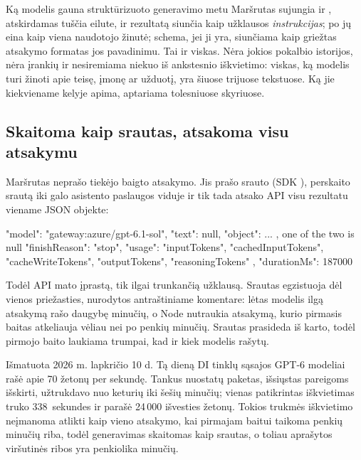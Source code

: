\begin{aibox}{Ką modelis gauna struktūrizuoto generavimo metu}
Maršrutas sujungia  ir , atskirdamas tuščia eilute, ir rezultatą
siunčia kaip užklausos \emph{instrukcijas}; po jų eina  kaip viena naudotojo
žinutė; schema, jei ji yra, siunčiama kaip griežtas atsakymo formatas jos pavadinimu. Tai ir
viskas. Nėra jokios pokalbio istorijos, nėra įrankių ir nesiremiama niekuo iš ankstesnio
iškvietimo: viskas, ką modelis turi žinoti apie teisę, įmonę ar užduotį, yra šiuose trijuose
tekstuose. Ką jie kiekviename kelyje apima, aptariama tolesniuose skyriuose.
\end{aibox}

\subsection{Skaitoma kaip srautas, atsakoma visu atsakymu}

Maršrutas neprašo tiekėjo baigto atsakymo. Jis prašo srauto (SDK ), perskaito
srautą iki galo asistento paslaugos viduje ir tik tada atsako API visu rezultatu viename JSON
objekte:

\begin{codeblock}
{ "model": "gateway:azure/gpt-6.1-sol",
  "text": null,  "object": { ... },      one of the two is null
  "finishReason": "stop",
  "usage": { "inputTokens", "cachedInputTokens", "cacheWriteTokens",
             "outputTokens", "reasoningTokens" },
  "durationMs": 187000 }
\end{codeblock}

Todėl API mato įprastą, tik ilgai trunkančią užklausą. Srautas egzistuoja dėl vienos
priežasties, nurodytos  antraštiniame komentare: lėtas modelis ilgą
atsakymą rašo daugybę minučių, o Node nutraukia atsakymą, kurio pirmasis baitas atkeliauja
vėliau nei po penkių minučių. Srautas prasideda iš karto, todėl pirmojo baito laukiama
trumpai, kad ir kiek modelis rašytų.

\begin{lessonbox}{Išmatuota 2026 m. lapkričio 10 d.}
Tą dieną DI tinklų sąsajos GPT-6 modeliai rašė apie 70 žetonų per sekundę. Tankus nuostatų
paketas, išsiųstas pareigoms išskirti, užtrukdavo nuo keturių iki šešių minučių; vienas
patikrintas iškvietimas truko 338~sekundes ir parašė 24\,000 išvesties žetonų. Tokios trukmės
iškvietimo neįmanoma atlikti kaip vieno atsakymo, kai pirmajam baitui taikoma penkių minučių
riba, todėl generavimas skaitomas kaip srautas, o toliau aprašytos viršutinės ribos yra
penkiolika minučių.
\end{lessonbox}

